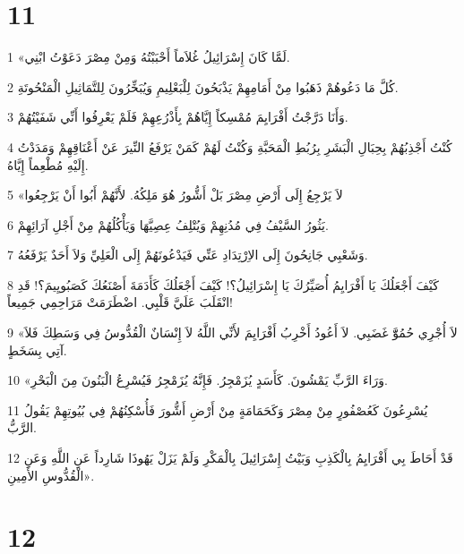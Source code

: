 \chapter{11}

\par 1 «لَمَّا كَانَ إِسْرَائِيلُ غُلاَماً أَحْبَبْتُهُ وَمِنْ مِصْرَ دَعَوْتُ ابْنِي.
\par 2 كُلَّ مَا دَعُوهُمْ ذَهَبُوا مِنْ أَمَامِهِمْ يَذْبَحُونَ لِلْبَعْلِيمِ وَيُبَخِّرُونَ لِلتَّمَاثِيلِ الْمَنْحُوتَةِ.
\par 3 وَأَنَا دَرَّجْتُ أَفْرَايِمَ مُمْسِكاً إِيَّاهُمْ بِأَذْرُعِهِمْ فَلَمْ يَعْرِفُوا أَنِّي شَفَيْتُهُمْ.
\par 4 كُنْتُ أَجْذِبُهُمْ بِحِبَالِ الْبَشَرِ بِرُبُطِ الْمَحَبَّةِ وَكُنْتُ لَهُمْ كَمَنْ يَرْفَعُ النِّيرَ عَنْ أَعْنَاقِهِمْ وَمَدَدْتُ إِلَيْهِ مُطْعِماً إِيَّاهُ.
\par 5 «لاَ يَرْجِعُ إِلَى أَرْضِ مِصْرَ بَلْ أَشُّورُ هُوَ مَلِكُهُ. لأَنَّهُمْ أَبُوا أَنْ يَرْجِعُوا
\par 6 يَثُورُ السَّيْفُ فِي مُدُنِهِمْ وَيُتْلِفُ عِصِيَّهَا وَيَأْكُلُهُمْ مِنْ أَجْلِ آرَائِهِمْ.
\par 7 وَشَعْبِي جَانِحُونَ إِلَى الاِرْتِدَادِ عَنِّي فَيَدْعُونَهُمْ إِلَى الْعَلِيِّ وَلاَ أَحَدٌ يَرْفَعُهُ.
\par 8 كَيْفَ أَجْعَلُكَ يَا أَفْرَايِمُ أُصَيِّرُكَ يَا إِسْرَائِيلُ؟! كَيْفَ أَجْعَلُكَ كَأَدَمَةَ أَصْنَعُكَ كَصَبُويِيمَ؟! قَدِ انْقَلَبَ عَلَيَّ قَلْبِي. اضْطَرَمَتْ مَرَاحِمِي جَمِيعاً!
\par 9 «لاَ أُجْرِي حُمُوَّّ غَضَبِي. لاَ أَعُودُ أَخْرِبُ أَفْرَايِمَ لأَنِّي اللَّهُ لاَ إِنْسَانٌ الْقُدُّوسُ فِي وَسَطِكَ فَلاَ آتِي بِسَخَطٍ.
\par 10 «وَرَاءَ الرَّبِّ يَمْشُونَ. كَأَسَدٍ يُزَمْجِرُ. فَإِنَّهُ يُزَمْجِرُ فَيُسْرِعُ الْبَنُونَ مِنَ الْبَحْرِ.
\par 11 يُسْرِعُونَ كَعُصْفُورٍ مِنْ مِصْرَ وَكَحَمَامَةٍ مِنْ أَرْضِ أَشُّورَ فَأُسْكِنُهُمْ فِي بُيُوتِهِمْ يَقُولُ الرَّبُّ.
\par 12 قَدْ أَحَاطَ بِي أَفْرَايِمُ بِالْكَذِبِ وَبَيْتُ إِسْرَائِيلَ بِالْمَكْرِ وَلَمْ يَزَلْ يَهُوذَا شَارِداً عَنِ اللَّهِ وَعَنِ الْقُدُّوسِ الأَمِينِ».

\chapter{12}

